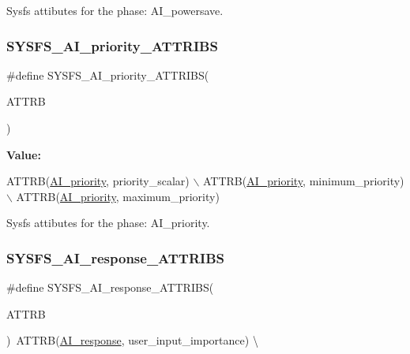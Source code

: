 Sysfs attibutes for the phase\+: A\+I\+\_\+powersave. 

\mbox{\label{group__sysfs__attrb__init_gad9f86b9d176151028e5eaa4bc9ff0f84}} 
\subsubsection{\texorpdfstring{S\+Y\+S\+F\+S\+\_\+\+A\+I\+\_\+priority\+\_\+\+A\+T\+T\+R\+I\+BS}{SYSFS\_AI\_priority\_ATTRIBS}}
{\footnotesize\ttfamily \#define S\+Y\+S\+F\+S\+\_\+\+A\+I\+\_\+priority\+\_\+\+A\+T\+T\+R\+I\+BS(\begin{DoxyParamCaption}\item[{}]{A\+T\+T\+RB }\end{DoxyParamCaption})}

{\bfseries Value\+:}
\begin{DoxyCode}
ATTRB(\hyperlink{AI__gov__phases_8h_a59664fef4d2987410ea13b917756d6aca734043b05a906ac69121cdb0df0d67da}{AI\_priority}, priority\_scalar) \(\backslash\)
            ATTRB(\hyperlink{AI__gov__phases_8h_a59664fef4d2987410ea13b917756d6aca734043b05a906ac69121cdb0df0d67da}{AI\_priority}, minimum\_priority) \(\backslash\)
            ATTRB(\hyperlink{AI__gov__phases_8h_a59664fef4d2987410ea13b917756d6aca734043b05a906ac69121cdb0df0d67da}{AI\_priority}, maximum\_priority)
\end{DoxyCode}


Sysfs attibutes for the phase\+: A\+I\+\_\+priority. 

\mbox{\label{group__sysfs__attrb__init_ga971760a5656c4eb275a661bd95a9f5f4}} 
\subsubsection{\texorpdfstring{S\+Y\+S\+F\+S\+\_\+\+A\+I\+\_\+response\+\_\+\+A\+T\+T\+R\+I\+BS}{SYSFS\_AI\_response\_ATTRIBS}}
{\footnotesize\ttfamily \#define S\+Y\+S\+F\+S\+\_\+\+A\+I\+\_\+response\+\_\+\+A\+T\+T\+R\+I\+BS(\begin{DoxyParamCaption}\item[{}]{A\+T\+T\+RB }\end{DoxyParamCaption})~A\+T\+T\+RB(\hyperlink{AI__gov__phases_8h_a59664fef4d2987410ea13b917756d6aca346eb46ca5be7e36dfa7be441e1be79d}{A\+I\+\_\+response}, user\+\_\+input\+\_\+importance) \textbackslash{}}



